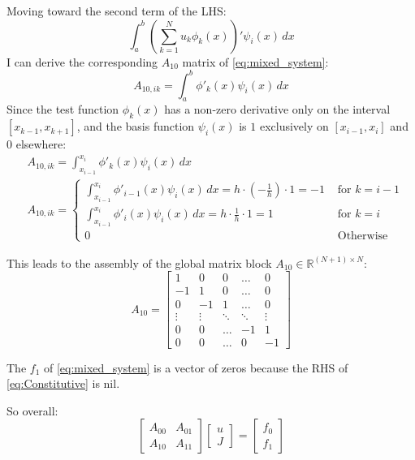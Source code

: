 \documentclass{article}
\begin{document}
Moving toward the second term of the LHS:
\begin{equation}
    \int_a^b \left(\sum_{k=1}^{N} u_k \phi_k(x)\right)' \psi_i(x) \, dx
\end{equation}
I can derive the corresponding $A_{10}$ matrix of \eqref{eq:mixed_system}:
\begin{equation}
    A_{10,ik} = \int_a^b \phi'_k(x) \psi_i(x) \, dx
\end{equation}
Since the test function $\phi_k(x)$ has a non-zero derivative only on the interval $[x_{k-1}, x_{k+1}]$, and the basis function $\psi_i(x)$ is $1$ exclusively on $[x_{i-1}, x_i]$ and $0$ elsewhere:
\begin{align*}
    &A_{10,ik} = \int_{x_{i-1}}^ {x_{i}} \phi'_k(x) \psi_i(x) \, dx  \\
    &A_{10,ik} = 
    \begin{cases}
           \int_{x_{i-1}}^ {x_{i}} \phi'_{i-1}(x) \psi_i(x) \, dx = h \cdot \left( - \frac{1}{h}\right)  \cdot 1 = - 1 &\text{  for } k = i-1 \\
           \int_{x_{i-1}}^ {x_{i}} \phi'_{i}(x) \psi_i(x) \, dx = h \cdot \frac{1}{h}  \cdot 1 =1 &\text{  for } k = i \\
           0 &\text{  Otherwise } 
    \end{cases}
\end{align*}

This leads to the assembly of the global matrix block $A_{10} \in \mathbb{R}^{(N+1) \times N}$:
\begin{equation} \label{eq:matrix_A10}
    A_{10} = 
    \begin{bmatrix}
         1 &  0 &  0 & \dots &  0 \\
        -1 &  1 &  0 & \dots &  0 \\
         0 & -1 &  1 & \dots &  0 \\
    \vdots & \vdots & \ddots & \ddots & \vdots \\
         0 &  0 & \dots & -1 &  1 \\
         0 &  0 & \dots &  0 & -1
    \end{bmatrix}
\end{equation}

The $f_1$ of \eqref{eq:mixed_system} is a vector of zeros because the RHS of \eqref{eq:Constitutive} is nil.

So overall:
\begin{equation*}
    \begin{bmatrix}
        A_{00} & A_{01} \\
        A_{10} & A_{11}
    \end{bmatrix}
    \begin{bmatrix}
        u \\
        J
    \end{bmatrix}
    =
    \begin{bmatrix}
        f_0 \\
        f_1
    \end{bmatrix}
\end{equation*}
\end{document}
